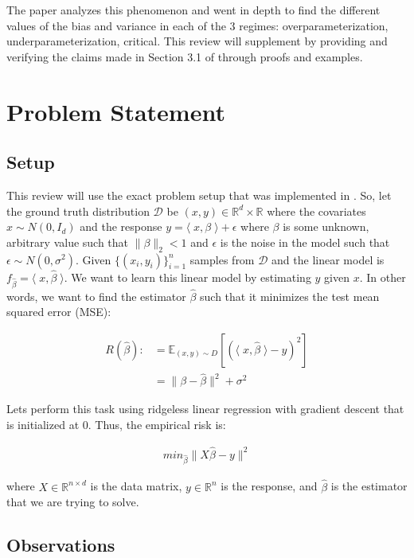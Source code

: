 \documentclass{article}
\begin{document}
The paper \cite{Nakkiran_2019} analyzes this phenomenon and went in depth to find the different values of the bias and variance in each of the 3 regimes: overparameterization, underparameterization, critical. This review will supplement \cite{Nakkiran_2019} by providing and verifying the claims made in Section 3.1 of \cite{Nakkiran_2019} through proofs and examples.

\section{Problem Statement}
\subsection{Setup}

This review will use the exact problem setup that was implemented in \cite{Nakkiran_2019}. So, let the ground truth distribution $\mathcal{D}$ be $(x,y) \in \mathbb{R}^d \times \mathbb{R}$ where the covariates $x \sim N(0, I_d)$ and the response $y = \langle \; x, \beta \; \rangle + \epsilon$ where $\beta$ is some unknown, arbitrary value such that $\|\beta\|_2 < 1$ and $\epsilon$ is the noise in the model such that $\epsilon \sim N(0, \sigma^2)$. Given $\{(x_i,y_i)\}_{i=1}^n$ samples from $\mathcal{D}$ and the linear model is $f_{\hat{\beta}} = \langle \; x,\hat{\beta} \; \rangle$. We want to learn this linear model by estimating $y$ given $x$. In other words, we want to find the estimator $\hat{\beta}$ such that it minimizes the test mean squared error (MSE):

\begin{align*}
    R(\hat{\beta}) :&= \mathbb{E}_{(x,y)\sim D} [(\langle \; x,\hat{\beta} \; \rangle- y)^2]\\
    &= \|\beta - \hat{\beta}\|^2 + \sigma^2
\end{align*}

Lets perform this task using ridgeless linear regression with gradient descent that is initialized at 0. Thus, the empirical risk is:

\begin{align*}
    min_{\hat{\beta}} \|X\hat{\beta} - y\|^2
\end{align*}

where $X \in \mathbb{R}^{n \times d}$ is the data matrix, $y \in \mathbb{R}^n$ is the response, and $\hat{\beta}$ is the estimator that we are trying to solve.

\subsection{Observations}
\end{document}
